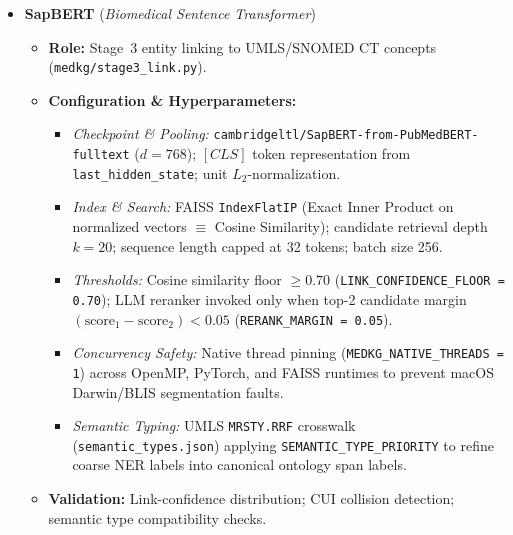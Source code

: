 {\begin{itemize}
\begin{itemize}
\begin{itemize}[itemsep=1pt,topsep=1pt]
            \item \textit{Execution \& Resilience:} 900\,s timeout (rewriter) / 300\,s timeout (Stage 2); 4 retries with exponential backoff; 4 concurrent worker threads; SHA-256 payload disk caching; client-side chain-of-thought stripping (\texttt{split\_reasoning} discarding \texttt{\#\# Thinking} and \texttt{<think>} traces); circuit breaker halting after 5 consecutive failures (\texttt{BackendUnavailable}); \texttt{--offline} rule-based fallback.
        \end{itemize}
        \item \textbf{Validation:} Tag-completeness checks; exact-match chunk text grounding; Pydantic schema validation (\texttt{Triple}, \texttt{Modifier}); closed 27-relation taxonomy guards.
    \end{itemize}

    \item \textbf{SapBERT} (\textit{Biomedical Sentence Transformer})
    \begin{itemize}
        \item \textbf{Role:} Stage~3 entity linking to UMLS/SNOMED CT concepts (\texttt{medkg/stage3\_link.py}).
        \item \textbf{Configuration \& Hyperparameters:}
        \begin{itemize}[itemsep=1pt,topsep=1pt]
            \item \textit{Checkpoint \& Pooling:} \texttt{cambridgeltl/SapBERT-from-PubMedBERT-fulltext} ($d = 768$); $[CLS]$ token representation from \texttt{last\_hidden\_state}; unit $L_2$-normalization.
            \item \textit{Index \& Search:} FAISS \texttt{IndexFlatIP} (Exact Inner Product on normalized vectors $\equiv$ Cosine Similarity); candidate retrieval depth $k = 20$; sequence length capped at 32 tokens; batch size 256.
            \item \textit{Thresholds:} Cosine similarity floor $\ge 0.70$ (\texttt{LINK\_CONFIDENCE\_FLOOR = 0.70}); LLM reranker invoked only when top-2 candidate margin $(\text{score}_1 - \text{score}_2) < 0.05$ (\texttt{RERANK\_MARGIN = 0.05}).
            \item \textit{Concurrency Safety:} Native thread pinning (\texttt{MEDKG\_NATIVE\_THREADS = 1}) across OpenMP, PyTorch, and FAISS runtimes to prevent macOS Darwin/BLIS segmentation faults.
            \item \textit{Semantic Typing:} UMLS \texttt{MRSTY.RRF} crosswalk (\texttt{semantic\_types.json}) applying \texttt{SEMANTIC\_TYPE\_PRIORITY} to refine coarse NER labels into canonical ontology span labels.
        \end{itemize}
        \item \textbf{Validation:} Link-confidence distribution; CUI collision detection; semantic type compatibility checks.
    \end{itemize}


\end{itemize}}
